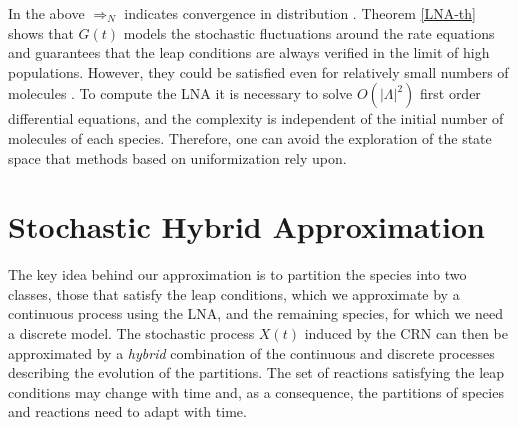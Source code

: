 \documentclass{llncs}
\begin{document}
In the above $\Rightarrow_N$ indicates convergence in distribution \cite{ethier2009markov}.
Theorem \ref{LNA-th} shows that $G(t)$ models the stochastic fluctuations around the rate equations and guarantees that the leap conditions are always verified in the limit of high populations. However, they could be satisfied even for relatively small numbers of molecules \cite{Wallace2012}.
To compute the LNA it is necessary to solve $O(|\Lambda|^2)$ first order differential equations, and the complexity is independent of the initial number of molecules of each species. %
Therefore, one can avoid the exploration of the state space that methods based on uniformization rely upon. 

\section{Stochastic Hybrid Approximation}

The key idea behind our approximation is to partition the species into two classes, those that satisfy the leap conditions, which we approximate by a continuous process using the LNA, and the remaining species, for which we need a discrete model. The stochastic process $X(t)$ induced by the CRN can then be approximated by a \emph{hybrid} combination of the continuous and discrete processes describing the evolution of the partitions. %
The set of reactions satisfying the leap conditions may change with time and, as a consequence, the partitions of species and reactions need to adapt with time.

\end{document}
